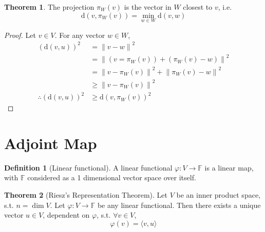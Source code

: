 \documentclass[fleqn, a4paper, 12pt]{article}
\theoremstyle{definition}
\newtheorem{definition}{Definition} %
\theoremstyle{theorem}
\newtheorem{theorem}{Theorem} %
\theoremstyle{remark}
\newcommand{\distance}{\mathrm{d}}
\numberwithin{corollary}{theorem}
\numberwithin{equation}{theorem}
\begin{document}
\begin{theorem}
	The projection $\pi_W(v)$ is the vector in $W$ closest to $v$, i.e.
	\begin{equation*}
		\distance \left( v, \pi_W(v) \right) = \min_{w \in W} \distance(v,w)
	\end{equation*}
\end{theorem}

\begin{proof}
	Let $v \in V$. For any vector $w \in W$,
	\begin{align*}
		\left( \distance(v,u) \right)^2 &= {\| v - w \|}^2\\
		&= \left\| \left( v = \pi_W(v) \right) + \left( \pi_W(v) - w \right) \right\|^2\\
		&= \left\| v - \pi_W(v) \right\|^2 + \left\| \pi_W(v) - w \right\|^2\\
		&\geq \left\| v - \pi_W(v) \right\|^2\\
	\therefore \left( \distance(v,u) \right)^2 &\geq \distance \left( v, \pi_W(v) \right)^2
	\end{align*}
\end{proof}

\section{Adjoint Map}

\begin{definition}[Linear functional]
	A linear functional $\varphi : V \to \mathbb{F}$ is a linear map, with $\mathbb{F}$ considered as a 1 dimensional vector space over itself.
\end{definition}

\begin{theorem}[Riesz's Representation Theorem]\label{Reisz's Representation Theorem}
	Let $V$ be an inner product space, s.t. $n = \dim V$. Let $\varphi : V \to \mathbb{F}$ be any linear functional. Then there exists a unique vector $u \in V$, dependent on $\varphi$, s.t. $\forall v \in V$,
	\begin{equation*}
		\varphi(v) = \langle v, u \rangle
	\end{equation*}
\end{theorem}
\end{document}
